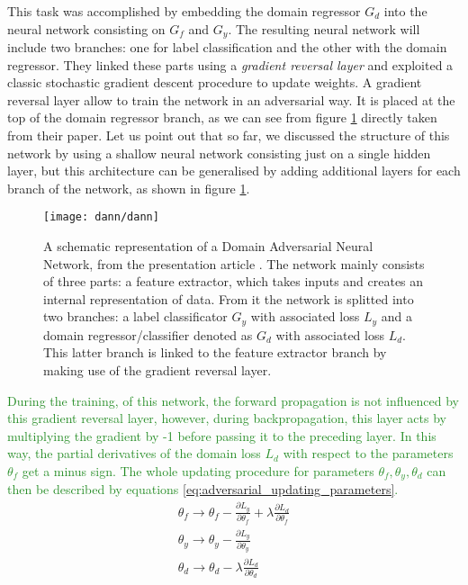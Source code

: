 \documentclass[11pt]{report}
\begin{document}
This task was accomplished by embedding the domain regressor $G_d$ into the neural network consisting on $G_f$ and $G_y$.
The resulting neural network will include two branches: one for label classification and the other with the domain regressor.
They linked these parts using a \emph{gradient reversal layer} and exploited a classic stochastic gradient descent procedure to update weights.
A gradient reversal layer allow to train the network in an adversarial way.
It is placed at the top of the domain regressor branch, as we can see from figure \ref{fig:dann_original} directly taken from their paper.
Let us point out that so far, we discussed the structure of this network by using a shallow neural network consisting just on a single hidden layer, but this architecture can be generalised by adding additional layers for each branch of the network, as shown in figure \ref{fig:dann_original}.


\begin{figure}[h]
\centering
\texttt{[image: dann/dann]}
\caption{A schematic representation of a Domain Adversarial Neural Network, from the presentation article \cite{ganin2016}. The network mainly consists of three parts: a feature extractor, which takes inputs and creates an internal representation of data. From it the network is splitted into two branches: a label classificator $G_y$ with associated loss $L_y$ and a domain regressor/classifier denoted as $G_d$ with associated loss $L_d$. This latter branch is linked to the feature extractor branch by making use of the gradient reversal layer.
}\label{fig:dann_original}
\end{figure}


\textcolor{ForestGreen}{
During the training, of this network, the forward propagation is not influenced by this gradient reversal layer, however, during backpropagation, this layer acts by multiplying the gradient by -1 before passing it to the preceding layer.
In this way, the partial derivatives of the domain loss $L_d$ with respect to the parameters $\theta_f$ get a minus sign.
The whole updating procedure for parameters $\theta_f, \theta_y, \theta_d$ can then be described by equations \ref{eq:adversarial_updating_parameters}.
}
\begin{equation}\label{eq:adversarial_updating_parameters}
\begin{split}
\theta_f \rightarrow \theta_f - \frac{\partial L_y}{\partial \theta_f} +  \lambda \frac{\partial L_d}{\partial \theta_f}\\
\theta_y \rightarrow \theta_y -  \frac{\partial L_y}{\partial \theta_y} \\
\theta_d \rightarrow \theta_d - \lambda \frac{\partial L_d}{\partial \theta_d}
\end{split}
\end{equation}
\end{document}
